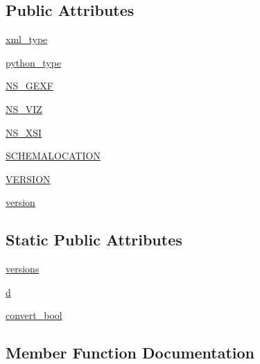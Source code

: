 \subsection*{Public Attributes}
\begin{DoxyCompactItemize}
\item 
\hyperlink{classnetworkx_1_1readwrite_1_1gexf_1_1GEXF_a935200b893f3a8c1ceef8fc016299b45}{xml\+\_\+type}
\item 
\hyperlink{classnetworkx_1_1readwrite_1_1gexf_1_1GEXF_a66c37b76dc7bf3ec69d1c9ef0632b3dc}{python\+\_\+type}
\item 
\hyperlink{classnetworkx_1_1readwrite_1_1gexf_1_1GEXF_adac22bd5a6fc210faba901ff815e216b}{N\+S\+\_\+\+G\+E\+XF}
\item 
\hyperlink{classnetworkx_1_1readwrite_1_1gexf_1_1GEXF_a9c3c57fd9be42313f72f840ebac6df4a}{N\+S\+\_\+\+V\+IZ}
\item 
\hyperlink{classnetworkx_1_1readwrite_1_1gexf_1_1GEXF_a6318e97cc7abaa0942c566f3fe8615b3}{N\+S\+\_\+\+X\+SI}
\item 
\hyperlink{classnetworkx_1_1readwrite_1_1gexf_1_1GEXF_acea6818ed0da9520613451a834ce5603}{S\+C\+H\+E\+M\+A\+L\+O\+C\+A\+T\+I\+ON}
\item 
\hyperlink{classnetworkx_1_1readwrite_1_1gexf_1_1GEXF_aa147d4223584508e679e7a4eafa55b74}{V\+E\+R\+S\+I\+ON}
\item 
\hyperlink{classnetworkx_1_1readwrite_1_1gexf_1_1GEXF_a3226aabb6dd2080faef052bca59a7a4d}{version}
\end{DoxyCompactItemize}
\subsection*{Static Public Attributes}
\begin{DoxyCompactItemize}
\item 
\hyperlink{classnetworkx_1_1readwrite_1_1gexf_1_1GEXF_af9e2cd51555a4772ff3351220842e669}{versions}
\item 
\hyperlink{classnetworkx_1_1readwrite_1_1gexf_1_1GEXF_a2a1fae67630a3ba5e5e816f612962c5e}{d}
\item 
\hyperlink{classnetworkx_1_1readwrite_1_1gexf_1_1GEXF_a19596496cb3cb68b31cd8b5abe8dd0a7}{convert\+\_\+bool}
\end{DoxyCompactItemize}


\subsection{Member Function Documentation}
\mbox{\label{classnetworkx_1_1readwrite_1_1gexf_1_1GEXF_ae3b9a62b4295f1412adab4617c84672e}} 
